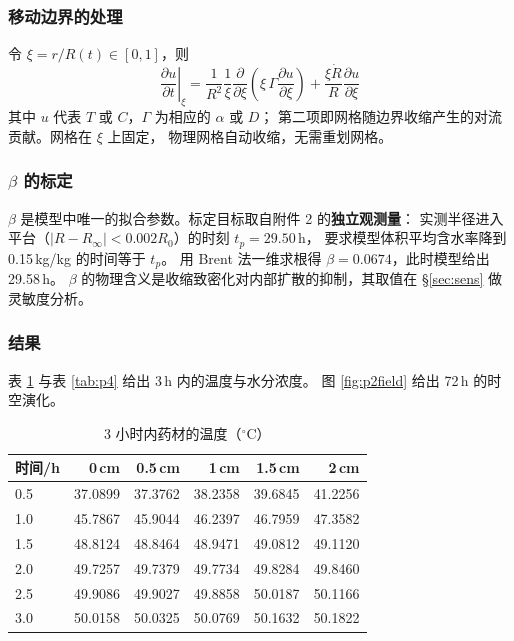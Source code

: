 \documentclass[withoutpreface,bwprint]{cumcmthesis}
\begin{document}
\subsubsection{移动边界的处理}
令 $\xi=r/R(t)\in[0,1]$，则
\begin{equation}
  \left.\frac{\partial u}{\partial t}\right|_{\xi}
  =\frac{1}{R^2}\frac{1}{\xi}\frac{\partial}{\partial \xi}\!\left(\xi\,\Gamma\frac{\partial u}{\partial\xi}\right)
  +\frac{\xi \dot R}{R}\frac{\partial u}{\partial \xi}
  \label{eq:moving}
\end{equation}
其中 $u$ 代表 $T$ 或 $C$，$\Gamma$ 为相应的 $\alpha$ 或 $D$；
第二项即网格随边界收缩产生的对流贡献。网格在 $\xi$ 上固定，
物理网格自动收缩，无需重划网格。

\subsubsection{$\beta$ 的标定}\label{sec:beta}
$\beta$ 是模型中唯一的拟合参数。标定目标取自附件 2 的\textbf{独立观测量}：
实测半径进入平台（$|R-R_\infty|<0.002R_0$）的时刻 $t_p=29.50$\,h，
要求模型体积平均含水率降到 0.15\,kg/kg 的时间等于 $t_p$。
用 Brent 法一维求根得 $\beta=0.0674$，此时模型给出 29.58\,h。
$\beta$ 的物理含义是收缩致密化对内部扩散的抑制，其取值在 \S\ref{sec:sens} 做灵敏度分析。

\subsubsection{结果}
表 \ref{tab:p3} 与表 \ref{tab:p4} 给出 3\,h 内的温度与水分浓度。
图 \ref{fig:p2field} 给出 72\,h 的时空演化。

\begin{table}[htbp]
  \centering
  \caption{3 小时内药材的温度（$^\circ$C）}
  \label{tab:p3}
  \small
  \begin{tabular}{@{}lrrrrr@{}}
    \toprule
    时间/h & 0\,cm & 0.5\,cm & 1\,cm & 1.5\,cm & 2\,cm \\
    \midrule
    0.5 & 37.0899 & 37.3762 & 38.2358 & 39.6845 & 41.2256 \\
    1.0 & 45.7867 & 45.9044 & 46.2397 & 46.7959 & 47.3582 \\
    1.5 & 48.8124 & 48.8464 & 48.9471 & 49.0812 & 49.1120 \\
    2.0 & 49.7257 & 49.7379 & 49.7734 & 49.8284 & 49.8460 \\
    2.5 & 49.9086 & 49.9027 & 49.8858 & 50.0187 & 50.1166 \\
    3.0 & 50.0158 & 50.0325 & 50.0769 & 50.1632 & 50.1822 \\
    \bottomrule
  \end{tabular}
\end{table}
\end{document}
